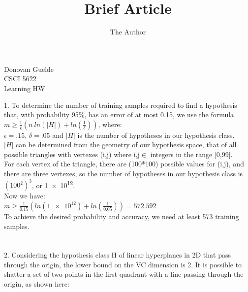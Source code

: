 \documentclass[11pt, oneside]{article}   	%
\title{Brief Article}
\author{The Author}
\begin{document}
\begin{flushright}
Donovan Guelde\\
CSCI 5622\\
Learning HW\\
\end{flushright}
1.  To determine the number of training samples required to find a hypothesis that, with probability 95\%, has an error of at most 0.15, we use the formula $m\geq \frac{1}{\epsilon} (n\ ln(|H|) + ln (\frac{1}{\delta}))$, where:\\
\indent $\epsilon = .15$, $\delta = .05$ and $|H|$ is the number of hypotheses in our hypothesis class.\\
\indent $|H|$ can be determined from the geometry of our hypothesis space, that of all possible triangles with vertexes (i,j) where i,j$\in$ integers in the range [0,99].\\
\indent For each vertex of the triangle, there are (100*100) possible values for (i,j), and there are three vertexes, so the number of hypotheses in our hypothesis class is $(100^2)^3$, or \num{1e12}.\\
\indent Now we have:\\
\indent $m\geq \frac{1}{0.15}(ln(\num{1e12})+ln(\frac{1}{0.05})) = 572.592$\\
\indent To achieve the desired probability and accuracy, we need at least 573 training samples.\\\\\\
2.  Considering the hypothesis class H of linear hyperplanes in 2D that pass through the origin, the lower bound on the VC dimension is 2.  It is possible to shatter a set of two points in the first quadrant with a line passing through the origin, as shown here:\\
\end{document}
